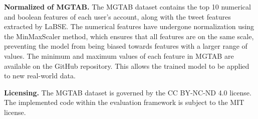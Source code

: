 \documentclass[10pt,twocolumn,letterpaper]{article}
\begin{document}
\begin{table*}[t]
\centering
\caption{Language that appears in MGTAB (ISO 639-1/639-2).}
\vspace{0.2cm}
\label{tab:A4}
\end{table*}


\noindent
\textbf{Normalized of MGTAB.}
The MGTAB dataset contains the top 10 numerical and boolean features of each user's account, along with the tweet features extracted by LaBSE. The numerical features have undergone normalization using the MinMaxScaler method, which ensures that all features are on the same scale, preventing the model from being biased towards features with a larger range of values. The minimum and maximum values of each feature in MGTAB are available on the GitHub repository. This allows the trained model to be applied to new real-world data.


\noindent
\textbf{Licensing.}
The MGTAB dataset is governed by the CC BY-NC-ND 4.0 license. The implemented code within the evaluation framework is subject to the MIT license.
\end{document}
